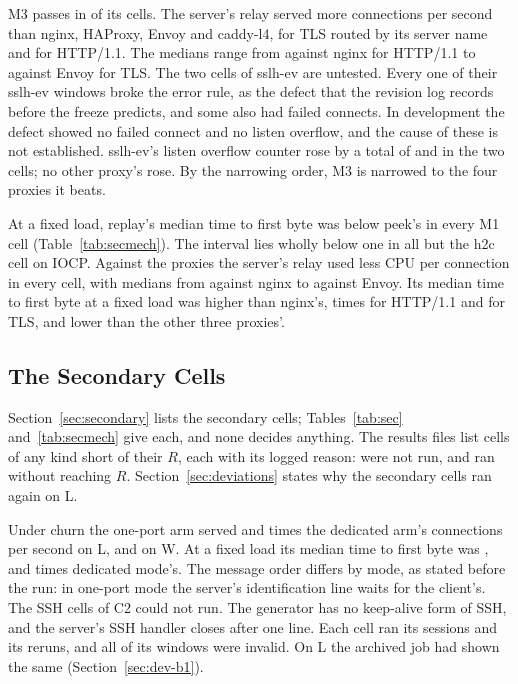  M3 passes in \CountPassMThree{} of its \CountHolmMThree{} cells. The server's relay
served more connections per second than nginx, HAProxy, Envoy and caddy-l4, for TLS routed by its
server name and for HTTP/1.1. The medians range from \MThreeLEpollHttpNginxMedian{} against
nginx for HTTP/1.1 to \MThreeLEpollTlsSniEnvoyMedian{} against Envoy for TLS. The two cells of
sslh-ev are untested. Every one of their sslh-ev windows broke the error rule, as the defect that
the revision log records before the freeze predicts, and some also had failed connects. In
development the defect showed no failed connect and no listen overflow, and the cause of these is
not established. sslh-ev's listen
overflow counter rose by a total of \MThreeLEpollTlsSniSslhEvProxyListenOverflows{} and
\MThreeLEpollHttpSslhEvProxyListenOverflows{} in the two cells; no other proxy's rose. By the
narrowing order, M3 is narrowed to the four proxies it beats.

 At a fixed load, replay's median time to first byte was below
peek's in every M1 cell (Table~\ref{tab:secmech}). The interval lies wholly below one in all but
the h2c cell on IOCP. Against the proxies the server's relay used less CPU per connection
in every cell, with medians from \SecMTtfbCpuMThreeLEpollHttpNginxCpuMedian{} against nginx to
\SecMTtfbCpuMThreeLEpollTlsSniEnvoyCpuMedian{} against Envoy. Its median time to first byte at a
fixed load was higher than nginx's, \SecMTtfbCpuSecMTtfbMThreeLEpollHttpNginxValueMedian{} times
for HTTP/1.1 and \SecMTtfbCpuSecMTtfbMThreeLEpollTlsSniNginxValueMedian{} for TLS, and lower than
the other three proxies'.

\subsection{The Secondary Cells}\label{sec:res-secondary}

Section~\ref{sec:secondary} lists the secondary cells; Tables~\ref{tab:sec} and~\ref{tab:secmech}
give each, and none decides anything. The results files list \CountNotRunList{} cells of any kind
short of their $R$, each with its logged reason: \CountNotRunNotRun{} were not run, and
\CountNotRunShort{} ran without reaching $R$. Section~\ref{sec:deviations} states why the secondary
cells ran again on L.

 Under churn the one-port arm served \SecSshSecSshCOneLEpollValueMedian{} and
\SecSshSecSshCOneLIouringValueMedian{} times the dedicated arm's connections per second on L, and
\SecSshSecSshCOneWIocpValueMedian{} on W. At a fixed load its median time to first byte was
\SecSshSecSshCThreeLEpollValueMedian, \SecSshSecSshCThreeLIouringValueMedian{} and
\SecSshSecSshCThreeWIocpValueMedian{} times dedicated mode's. The message order differs by mode, as
stated before the run: in one-port mode the server's identification line waits for the client's.
The \CountSshCtwoCells{} SSH cells of C2 could not run. The generator has no keep-alive form of SSH,
and the server's SSH handler closes after one line. Each cell ran its sessions and its reruns, and
all \CountSshCtwoWindows{} of its windows were invalid. On L the archived job \JobSlOne{} had shown
the same (Section~\ref{sec:dev-b1}).

